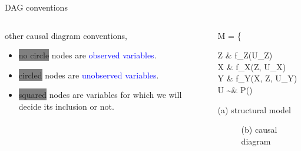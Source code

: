 %
%
\begin{frame}
	{DAG conventions}
	\begin{columns}
		\begin{column}{0.5\textwidth}
			other causal diagram conventions,
			\begin{itemize}
				\item \colorbox{gray}{no circle} nodes are \textcolor{blue}{observed variables}.
				\item \colorbox{gray}{circled} nodes are \textcolor{blue}{unobserved variables}.
				\item \colorbox{gray}{squared} nodes are variables for which we will decide its inclusion or not.
			\end{itemize}
		\end{column}
		\begin{column}{0.5\textwidth}  
			\begin{equ}
				M = \left\{ \begin{aligned} 
					Z \leftarrow & \; f_{Z}(U_{Z}) \\
					X \leftarrow & \; f_{X}(Z, U_{X}) \\
					Y \leftarrow & \; f_{Y}(X, Z, U_{Y}) \\
					U \sim & \; P()
				\end{aligned} \right
				\caption*{(a) structural model}
			\end{equ}
			\begin{figure}
				\caption*{(b) causal diagram }
			\end{figure}
		\end{column}
	\end{columns}
\end{frame}
